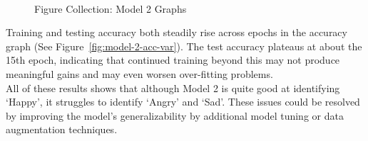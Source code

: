 \begin{figure}[H]
    \centering
    \qquad
    \vspace{0.5cm}
    \\
    \scriptsize{Figure Collection: Model 2 Graphs}
\end{figure}
\indent Training and testing accuracy both steadily rise across epochs in the accuracy graph (See Figure~\ref{fig:model-2-acc-var}).
The test accuracy plateaus at about the 15th epoch, indicating that continued training beyond this may not produce meaningful gains and may even worsen over-fitting problems.
\\
\indent All of these results shows that although Model 2 is quite good at identifying `Happy', it struggles to identify `Angry' and `Sad'.
These issues could be resolved by improving the model's generalizability by additional model tuning or data augmentation techniques.

